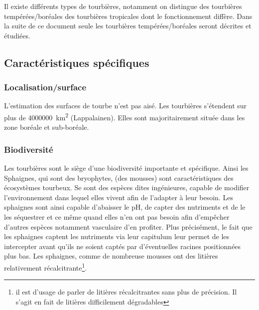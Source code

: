 Il existe différents types de tourbières, notamment on distingue des tourbières tempérées/boréales des tourbières tropicales dont le fonctionnement diffère.
Dans la suite de ce document seule les tourbières tempérées/boréales seront décrites et étudiées.

\subsection{Caractéristiques spécifiques}

\subsubsection{Localisation/surface}
L'estimation des surfaces de tourbe n'est pas aisé.
Les tourbières s'étendent sur plus de \SI{4000000}{\square\km} (Lappalainen).
Elles sont majoritairement située dans les zone boréale et sub-boréale.

\subsubsection{Biodiversité}

Les tourbières sont le siège d'une biodiversité importante et spécifique.
Ainsi les Sphaignes, qui sont des bryophytes, (des mousses) sont caractéristiques des écosystèmes tourbeux.
Se sont des espèces dites ingénieures, capable de modifier l'environnement dans lequel elles vivent afin de l'adapter à leur besoin.
Les sphaignes sont ainsi capable d'abaisser le pH, de capter des nutriments et de le les séquestrer et ce même quand elles n'en ont pas besoin afin d'empêcher d'autres espèces notamment vasculaire d'en profiter.
Plus précisément, le fait que les sphaignes captent les nutriments via leur capitulum leur permet de les intercepter avant qu'ils ne soient captés par d'éventuelles racines positionnées plus bas.
Les sphaignes, comme de nombreuse mousses ont des litières relativement récalcitrante\footnote{il est d'usage de parler de litières récalcitrantes sans plus de précision. Il s'agit en fait de litières difficilement dégradables}.

